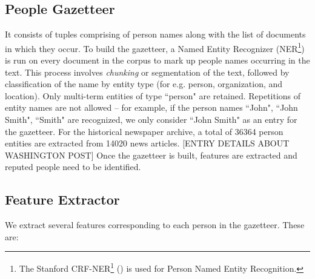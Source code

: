 \documentclass[a4paper,man,natbib]{apa6}
\begin{document}
\subsection{People Gazetteer} It consists of tuples comprising of person names along with the list of documents in which they occur. To build the gazetteer, a Named Entity Recognizer (NER\footnote{The Stanford CRF-NER\footnote{http://nlp.stanford.edu/software/CRF-NER.shtml} (\cite{mccallum2003early, finkel2005incorporating, sutton2011introduction})  is used for Person Named Entity Recognition. }) is run on every document in the corpus to mark up people names occurring in the text. This process involves \emph{chunking} or segmentation of the text, followed by classification of the name by entity type (for e.g. person, organization, and location). Only multi-term entities of type ``person" are retained. Repetitions of entity names are not allowed -- for example, if the person names ``John", ``John Smith", ``Smith" are recognized, we only consider ``John Smith" as an entry for the gazetteer. For the historical newspaper archive, a total of 36364 person entities are extracted from 14020 news articles. [ENTRY DETAILS ABOUT WASHINGTON POST]
Once the gazetteer is built, features are extracted and reputed people need to be identified.

\subsection{Feature Extractor} We extract several features corresponding to each person in the gazetteer. These are:
\end{document}
